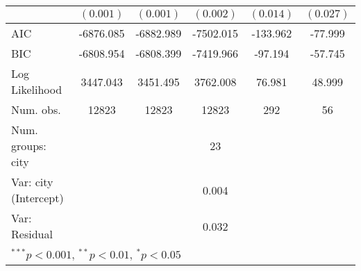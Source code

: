 \begin{table}[h!]
\begin{center}
\begin{tabular}{l c c c c c }
                                   & $(0.001)$     & $(0.001)$     & $(0.002)$      & $(0.014)$     & $(0.027)$     \\
\midrule
AIC                                & -6876.085     & -6882.989     & -7502.015      & -133.962      & -77.999       \\
BIC                                & -6808.954     & -6808.399     & -7419.966      & -97.194       & -57.745       \\
Log Likelihood                     & 3447.043      & 3451.495      & 3762.008       & 76.981        & 48.999        \\
Num. obs.                          & 12823         & 12823         & 12823          & 292           & 56            \\
Num. groups: city                  &               &               & 23             &               &               \\
Var: city (Intercept)              &               &               & 0.004          &               &               \\
Var: Residual                      &               &               & 0.032          &               &               \\
\bottomrule
\multicolumn{6}{l}{\scriptsize{$^{***}p<0.001$, $^{**}p<0.01$, $^*p<0.05$}}
\end{tabular}
\label{table:coefficients}
\end{center}
\end{table}

\newpage

